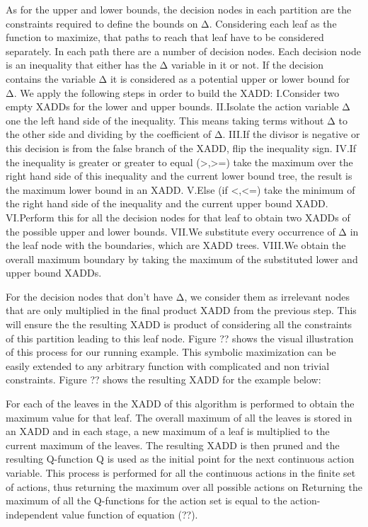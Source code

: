 \documentclass[letterpaper]{article}
\renewcommand{\-}{\text{-}}
\begin{document}
As for the upper and lower bounds, the decision nodes in each partition are the constraints required to define the bounds on Δ. Considering each leaf as the function to maximize, that paths to reach that leaf have to be considered separately. In each path there are a number of decision nodes. Each decision node is an inequality that either has the Δ variable in it or not. If the decision contains the variable Δ it is considered as a potential upper or lower bound for Δ. We apply the following steps in order to build the XADD: 
I.Consider two empty XADDs for the lower and upper bounds.
II.Isolate the action variable Δ one the left hand side of the inequality. This means taking terms without Δ to the other side and dividing by the coefficient of Δ. 
III.If the divisor is negative or this decision is from the false branch of the XADD, flip the inequality sign. 
IV.If the inequality is greater or greater to equal (>,>=) take the maximum over the right hand side of this inequality and the current lower bound tree, the result is the maximum lower bound in an XADD.
V.Else (if <,<=) take the minimum of the right hand side of the inequality and the current upper bound XADD. 
VI.Perform this for all the decision nodes for that leaf to obtain two XADDs of the possible upper and lower bounds. 
VII.We substitute every occurrence of Δ in the leaf node with the boundaries, which are XADD trees.
VIII.We obtain the overall maximum boundary by taking the maximum of the substituted lower and upper bound XADDs. 

For the decision nodes that don’t have Δ, we consider them as irrelevant nodes that are only multiplied in the final product XADD from the previous step. This will ensure the the resulting XADD is product of considering all the constraints of this partition leading to this leaf node. Figure ?? shows the visual illustration of this process for our running example. 
This symbolic maximization can be easily extended to any arbitrary function with complicated and non trivial constraints. Figure ?? shows the resulting XADD for the example below: 

For each of the leaves in the XADD of   this algorithm is performed to obtain the maximum value for that leaf. The overall maximum of all the leaves is stored in an XADD and in each stage, a new maximum of a leaf is multiplied to the current maximum of the leaves. The resulting XADD is then pruned and the resulting Q-function Q is used as the initial point for the next continuous action variable. This process is performed for all the continuous actions in the finite set of actions, thus returning the maximum over all possible actions on   Returning the maximum of all the Q-functions for the action set is equal to the action-independent value function of equation (??). 
\end{document}
